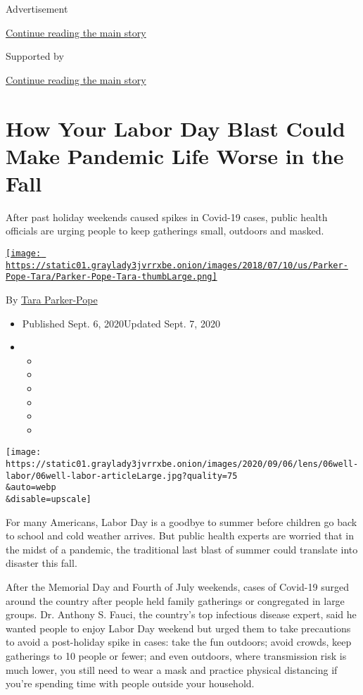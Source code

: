 Advertisement

\protect\hyperlink{after-top}{Continue reading the main story}

Supported by

\protect\hyperlink{after-sponsor}{Continue reading the main story}

\hypertarget{how-your-labor-day-blast-could-make-pandemic-life-worse-in-the-fall}{%
\section{How Your Labor Day Blast Could Make Pandemic Life Worse in the
Fall}\label{how-your-labor-day-blast-could-make-pandemic-life-worse-in-the-fall}}

After past holiday weekends caused spikes in Covid-19 cases, public
health officials are urging people to keep gatherings small, outdoors
and masked.

\href{https://www.nytimes3xbfgragh.onion/by/tara-parker-pope}{\texttt{[image: https://static01.graylady3jvrrxbe.onion/images/2018/07/10/us/Parker-Pope-Tara/Parker-Pope-Tara-thumbLarge.png]}}

By \href{https://www.nytimes3xbfgragh.onion/by/tara-parker-pope}{Tara
Parker-Pope}

\begin{itemize}
\item
  Published Sept. 6, 2020Updated Sept. 7, 2020
\item
  \begin{itemize}
  \item
  \item
  \item
  \item
  \item
  \item
  \end{itemize}
\end{itemize}

\texttt{[image: https://static01.graylady3jvrrxbe.onion/images/2020/09/06/lens/06well-labor/06well-labor-articleLarge.jpg?quality=75\\\&auto=webp\\\&disable=upscale]}

For many Americans, Labor Day is a goodbye to summer before children go
back to school and cold weather arrives. But public health experts are
worried that in the midst of a pandemic, the traditional last blast of
summer could translate into disaster this fall.

After the Memorial Day and Fourth of July weekends, cases of Covid-19
surged around the country after people held family gatherings or
congregated in large groups. Dr. Anthony S. Fauci, the country's top
infectious disease expert, said he wanted people to enjoy Labor Day
weekend but urged them to take precautions to avoid a post-holiday spike
in cases: take the fun outdoors; avoid crowds, keep gatherings to 10
people or fewer; and even outdoors, where transmission risk is much
lower, you still need to wear a mask and practice physical distancing if
you're spending time with people outside your household.

